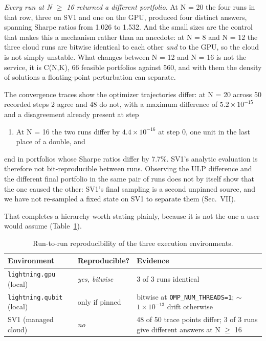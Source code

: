 \documentclass[journal]{IEEEtran}
\begin{document}
\textit{Every run at N $\geq$ 16 returned a different portfolio.} At N = 20 the four runs in that row, three on SV1 and one on the GPU, produced four distinct answers, spanning Sharpe ratios from 1.026 to 1.532. And the small sizes are the control that makes this a mechanism rather than an anecdote: at N = 8 and N = 12 the three cloud runs are bitwise identical to each other \textit{and} to the GPU, so the cloud is not simply unstable. What changes between N = 12 and N = 16 is not the service, it is C(N,K), 66 feasible portfolios against 560, and with them the density of solutions a floating-point perturbation can separate.


The convergence traces show the optimizer trajectories differ: at N = 20 across 50 recorded steps 2 agree and 48 do not, with a maximum difference of $5.2\times 10^{-15}$ and a disagreement already present at step

\begin{enumerate}
\item At N = 16 the two runs differ by $4.4\times 10^{-16}$ at step 0, one unit in the last place of a double, and
\end{enumerate}

end in portfolios whose Sharpe ratios differ by 7.7\%. SV1's analytic evaluation is therefore not bit-reproducible between runs. Observing the ULP difference and the different final portfolio in the same pair of runs does not by itself show that the one caused the other: SV1's final sampling is a second unpinned source, and we have not re-sampled a fixed state on SV1 to separate them (Sec.~VII).


That completes a hierarchy worth stating plainly, because it is not the one a user would assume (Table~\ref{tab:S29}).





\begin{table}[!t]
\centering
\scriptsize
\caption{Run-to-run reproducibility of the three execution environments.}
\label{tab:S29}
\begin{tabular}{p{}lp{}}
\toprule
Environment & Reproducible? & Evidence \\
\midrule
\texttt{lightning.gpu} (local) & \textit{yes, bitwise} & 3 of 3 runs identical \\
\texttt{lightning.qubit} (local) & only if pinned & bitwise at \texttt{OMP\_NUM\_THREADS=1}; $\sim$$1\times 10^{-13}$ drift otherwise \\
SV1 (managed cloud) & \textit{no} & 48 of 50 trace points differ; 3 of 3 runs give different answers at N $\geq$ 16 \\
\bottomrule
\end{tabular}
\end{table}
\end{document}
